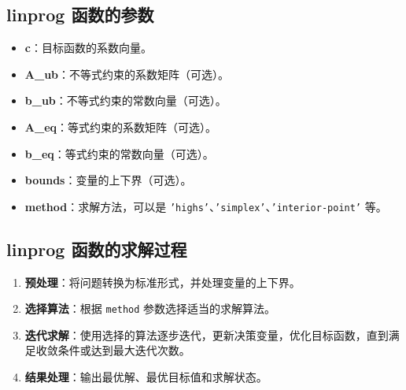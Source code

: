 \documentclass{article}
\begin{document}
\subsection{linprog 函数的参数}
\begin{itemize}
    \item \textbf{c}：目标函数的系数向量。
    \item \textbf{A\_ub}：不等式约束的系数矩阵（可选）。
    \item \textbf{b\_ub}：不等式约束的常数向量（可选）。
    \item \textbf{A\_eq}：等式约束的系数矩阵（可选）。
    \item \textbf{b\_eq}：等式约束的常数向量（可选）。
    \item \textbf{bounds}：变量的上下界（可选）。
    \item \textbf{method}：求解方法，可以是 \texttt{'highs'}、\texttt{'simplex'}、\texttt{'interior-point'} 等。
\end{itemize}

\subsection{linprog 函数的求解过程}
\begin{enumerate}
    \item \textbf{预处理}：将问题转换为标准形式，并处理变量的上下界。
    \item \textbf{选择算法}：根据 \texttt{method} 参数选择适当的求解算法。
    \item \textbf{迭代求解}：使用选择的算法逐步迭代，更新决策变量，优化目标函数，直到满足收敛条件或达到最大迭代次数。
    \item \textbf{结果处理}：输出最优解、最优目标值和求解状态。
\end{enumerate}
\end{document}

